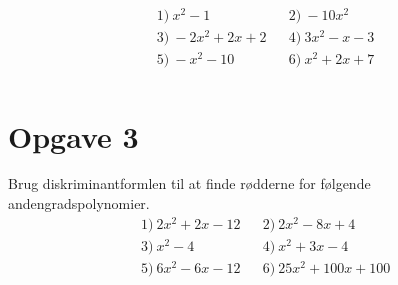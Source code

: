 \begin{align*}
&1) \  x^2-1   &&2) \ -10x^2    \\
&3) \   -2x^2+2x+2  &&4) \  3x^2-x-3   \\
&5) \ -x^2-10    &&6) \  x^2+2x+7   \\
\end{align*}

\section*{Opgave 3}
Brug diskriminantformlen til at finde rødderne for følgende andengradspolynomier.
\begin{align*}
&1) \ 2x^2+2x-12   &&2) \ 2x^2-8x+4   \\
&3) \ x^2-4  &&4) \   x^2+3x-4  \\
&5) \ 6x^2-6x-12  &&6) \ 25x^2+100x+100   \\
\end{align*}